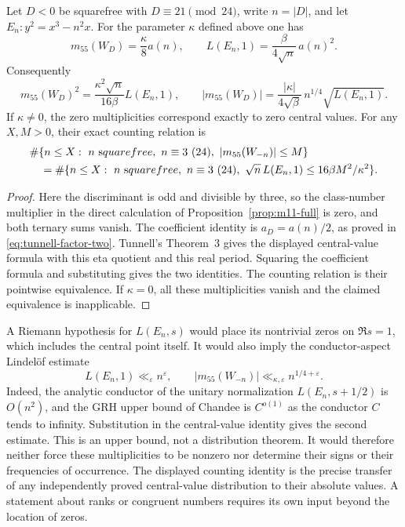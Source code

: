 \begin{theorem}\label{thm:tunnell-multiplicity}
Let \(D<0\) be squarefree with \(D\equiv21\pmod{24}\),
write \(n=|D|\), and let \(E_n:y^2=x^3-n^2x\).
For the parameter \(\kappa\) defined above one has
\[
 m_{55}(W_D)=\frac{\kappa}{8}a(n),\qquad
 L(E_n,1)=\frac{\beta}{4\sqrt n}\,a(n)^2.
\]
Consequently
\[
 m_{55}(W_D)^2=
       \frac{\kappa^2\sqrt n}{16\beta}L(E_n,1),\qquad
 |m_{55}(W_D)|=
       \frac{|\kappa|}{4\sqrt\beta}\,
       n^{1/4}\sqrt{L(E_n,1)}.
\]
If \(\kappa\ne0\), the zero multiplicities correspond exactly to
zero central values. For any \(X,M>0\), their exact counting
relation is
\[
 \begin{split}
 &\#\{n\le X:\ n\ {\mathrm squarefree},\ n\equiv3\ (24),\
                    |m_{55}(W_{-n})|\le M\}\\
 &\quad=
 \#\{n\le X:\ n\ {\mathrm squarefree},\ n\equiv3\ (24),\
             \sqrt n\,L(E_n,1)\le16\beta M^2/\kappa^2\}.
 \end{split}
\]
\end{theorem}
\begin{proof}
Here the discriminant is odd and divisible by three, so the
class-number multiplier in the direct calculation of
Proposition~\ref{prop:m11-full} is zero, and both ternary sums
vanish. The coefficient identity is \(a_D=a(n)/2\), as proved in
\eqref{eq:tunnell-factor-two}.
Tunnell's Theorem~3 \cite[pp.~328--329]{Tunnell1983}
gives the displayed central-value formula with this eta quotient
and this real period. Squaring the coefficient formula and
substituting gives the two identities. The counting relation is
their pointwise equivalence. If \(\kappa=0\), all these
multiplicities vanish and the claimed equivalence is inapplicable.
\end{proof}

A Riemann hypothesis for \(L(E_n,s)\) would place its nontrivial
zeros on \(\Re s=1\), which includes the central point itself.
It would also imply the conductor-aspect Lindel\"of estimate
\[
 L(E_n,1)\ll_\varepsilon n^\varepsilon,\qquad
 |m_{55}(W_{-n})|\ll_{\kappa,\varepsilon}n^{1/4+\varepsilon}.
\]
Indeed, the analytic conductor of the unitary normalization
$L(E_n,s+1/2)$ is $O(n^2)$, and the GRH upper bound of
Chandee \cite[Corollaries~1.1 and~1.3, p.~3]{Chandee2009}
is $C^{o(1)}$ as the conductor $C$ tends to infinity.
Substitution in the central-value identity gives the second estimate.
This is an upper bound, not a distribution theorem.
It would therefore neither force these multiplicities to be nonzero
nor determine their signs or their frequencies of occurrence.
The displayed counting identity is the precise transfer of any
independently proved central-value distribution to their absolute
values. A statement about ranks or congruent numbers requires its
own input beyond the location of zeros.
